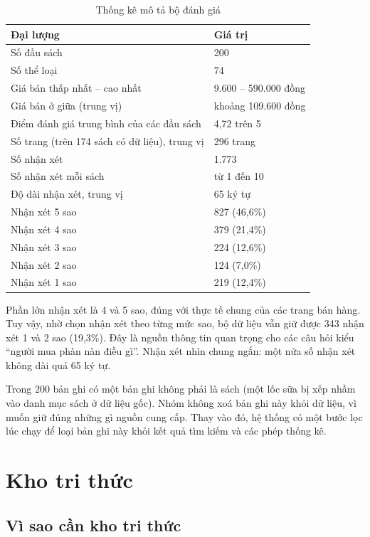 \begin{table}[!htbp]
\caption{Thống kê mô tả bộ đánh giá}
\label{tab:mo-ta}
\cobang
\begin{tabularx}{\linewidth}{YR{5.4cm}}
\toprule
\textbf{Đại lượng} & \textbf{Giá trị}\\
\midrule
Số đầu sách & 200\\
Số thể loại & 74\\
Giá bán thấp nhất -- cao nhất & 9.600 -- 590.000 đồng\\
Giá bán ở giữa (trung vị) & khoảng 109.600 đồng\\
Điểm đánh giá trung bình của các đầu sách & 4,72 trên 5\\
Số trang (trên 174 sách có dữ liệu), trung vị & 296 trang\\
\midrule
Số nhận xét & 1.773\\
Số nhận xét mỗi sách & từ 1 đến 10\\
Độ dài nhận xét, trung vị & 65 ký tự\\
Nhận xét 5 sao & 827 (46,6\%)\\
Nhận xét 4 sao & 379 (21,4\%)\\
Nhận xét 3 sao & 224 (12,6\%)\\
Nhận xét 2 sao & 124 (7,0\%)\\
Nhận xét 1 sao & 219 (12,4\%)\\
\bottomrule
\end{tabularx}
\end{table}

Phần lớn nhận xét là 4 và 5 sao, đúng với thực tế chung của các trang bán hàng. Tuy vậy, nhờ chọn nhận xét theo từng mức sao, bộ dữ liệu vẫn giữ được 343 nhận xét 1 và 2 sao (19,3\%). Đây là nguồn thông tin quan trọng cho các câu hỏi kiểu ``người mua phàn nàn điều gì''. Nhận xét nhìn chung ngắn: một nửa số nhận xét không dài quá 65 ký tự.

Trong 200 bản ghi có một bản ghi không phải là sách (một lốc sữa bị xếp nhầm vào danh mục sách ở dữ liệu gốc). Nhóm không xoá bản ghi này khỏi dữ liệu, vì muốn giữ đúng những gì nguồn cung cấp. Thay vào đó, hệ thống có một bước lọc lúc chạy để loại bản ghi này khỏi kết quả tìm kiếm và các phép thống kê.

\section{Kho tri thức}
\label{sec:kho-tri-thuc}

\subsection{Vì sao cần kho tri thức}

